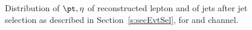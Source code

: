 \begin{figure}
    \caption{Distribution of $\pt, \eta$ of reconstructed lepton and \pt of jets
        after \PQb jet selection as described in Section~\ref{s:secEvtSel}, 
    for \mujets and \ejets channel.}
    \label{fig:btagPlot1}
\end{figure}

